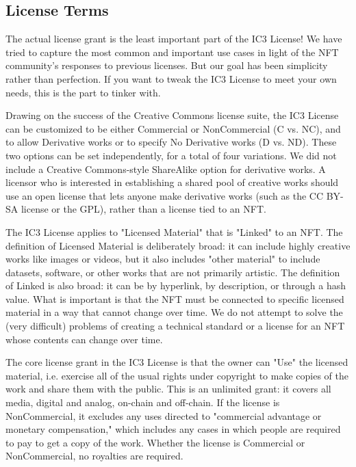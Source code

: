 \documentclass{article}
\begin{document}
\subsection{License Terms}

The actual license grant is the least important part of the IC3 License! We have tried to capture the most common and important use cases in light of the NFT community's responses to previous licenses. But our goal has been simplicity rather than perfection. If you want to tweak the IC3 License to meet your own needs, this is the part to tinker with.

Drawing on the success of the Creative Commons license suite, the IC3 License can be customized to be either Commercial or NonCommercial (C vs. NC), and to allow Derivative works or to specify No Derivative works (D vs. ND). These two options can be set independently, for a total of four variations. We did not include a Creative Commons-style ShareAlike option for derivative works. A licensor who is interested in establishing a shared pool of creative works should use an open license that lets anyone make derivative works (such as the CC BY-SA license or the GPL), rather than a license tied to an NFT.

The IC3 License applies to "Licensed Material" that is "Linked" to an NFT. The definition of Licensed Material is deliberately broad: it can include highly creative works like images or videos, but it also includes "other material" to include datasets, software, or other works that are not primarily artistic. The definition of Linked is also broad: it can be by hyperlink, by description, or through a hash value. What is important is that the NFT must be connected to specific licensed material in a way that cannot change over time. We do not attempt to solve the (very difficult) problems of creating a technical standard or a license for an NFT whose contents can change over time.

The core license grant in the IC3 License is that the owner can "Use" the licensed material, i.e. exercise all of the usual rights under copyright to make copies of the work and share them with the public. This is an unlimited grant: it covers all media, digital and analog, on-chain and off-chain. If the license is NonCommercial, it excludes any uses directed to "commercial advantage or monetary compensation," which includes any cases in which people are required to pay to get a copy of the work. Whether the license is Commercial or NonCommercial, no royalties are required.
\end{document}
